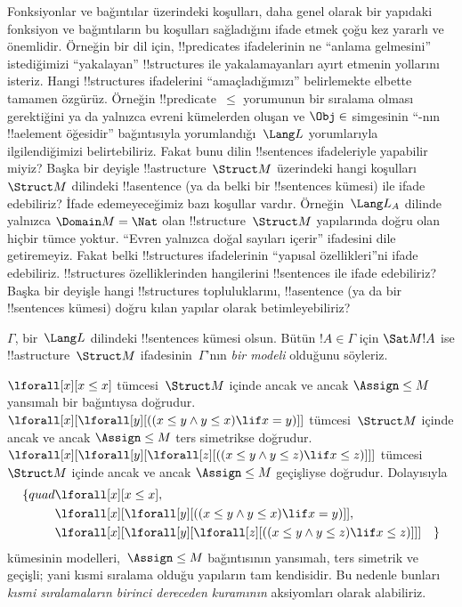 \documentclass[../../../include/open-logic-section]{subfiles}
\begin{document}


\begin{explain}
Fonksiyonlar ve bağıntılar üzerindeki koşulları, daha genel olarak bir
yapıdaki fonksiyon ve bağıntıların bu koşulları sağladığını ifade etmek
çoğu kez yararlı ve önemlidir. Örneğin bir dil için, !!{predicate}s
ifadelerinin ne ``anlama gelmesini'' istediğimizi ``yakalayan''
!!{structure}s ile yakalamayanları ayırt etmenin yollarını isteriz.
Hangi !!{structure}s ifadelerini ``amaçladığımızı'' belirlemekte
elbette tamamen özgürüz. Örneğin !!{predicate}~$\le$ yorumunun bir
sıralama olması gerektiğini ya da yalnızca evreni kümelerden oluşan ve
$\Obj\in$ simgesinin ``-nın !!a{element} öğesidir'' bağıntısıyla
yorumlandığı~$\Lang L$ yorumlarıyla ilgilendiğimizi belirtebiliriz.
Fakat bunu dilin !!{sentence}s ifadeleriyle yapabilir miyiz? Başka bir
deyişle !!a{structure}~$\Struct M$ üzerindeki hangi koşulları
$\Struct M$ dilindeki !!a{sentence} (ya da belki bir !!{sentence}s
kümesi) ile ifade edebiliriz? İfade edemeyeceğimiz bazı koşullar
vardır. Örneğin~$\Lang L_A$ dilinde yalnızca
$\Domain M=\Nat$ olan !!{structure}~$\Struct M$ yapılarında doğru olan
hiçbir tümce yoktur. ``Evren yalnızca doğal sayıları içerir''
ifadesini dile getiremeyiz. Fakat belki !!{structure}s ifadelerinin
``yapısal özellikleri''ni ifade edebiliriz. !!{structure}s
özelliklerinden hangilerini !!{sentence}s ile ifade edebiliriz? Başka
bir deyişle hangi !!{structure}s topluluklarını, !!a{sentence} (ya da
bir !!{sentence}s kümesi) doğru kılan yapılar olarak betimleyebiliriz?
\end{explain}

\begin{defn}
$\Gamma$, bir~$\Lang L$ dilindeki !!{sentence}s kümesi olsun. Bütün
$!A\in\Gamma$ için $\Sat M{!A}$ ise !!a{structure}~$\Struct M$
ifadesinin~$\Gamma$'nın \emph{bir modeli} olduğunu söyleriz.
\end{defn}

\begin{ex}
$\lforall[x][x\leq x]$ tümcesi~$\Struct M$ içinde ancak ve ancak
$\Assign\le M$ yansımalı bir bağıntıysa doğrudur.
$\lforall[x][\lforall[y][((x\leq y\land y\leq x)\lif x=y)]]$
tümcesi~$\Struct M$ içinde ancak ve ancak $\Assign\le M$ ters
simetrikse doğrudur.
$\lforall[x][\lforall[y][\lforall[z][((x\leq y\land y\leq z)
\lif x\leq z)]]]$ tümcesi~$\Struct M$ içinde ancak ve ancak
$\Assign\le M$ geçişliyse doğrudur. Dolayısıyla
\begin{align*}
\{quad &\lforall[x][x \le x], \\
   & \lforall[x][\lforall[y][((x \le y \land y \le
    x) \lif x = y)]], \\
   &\lforall[x][\lforall[y][\lforall[z][((x \le y
      \land y \le z) \lif x \le z)]]] \quad \}
\end{align*}
kümesinin modelleri,~$\Assign\le M$ bağıntısının yansımalı, ters
simetrik ve geçişli; yani kısmi sıralama olduğu yapıların tam
kendisidir. Bu nedenle bunları \emph{kısmi sıralamaların birinci
dereceden kuramının} aksiyomları olarak alabiliriz.
\end{ex}
\end{document}
